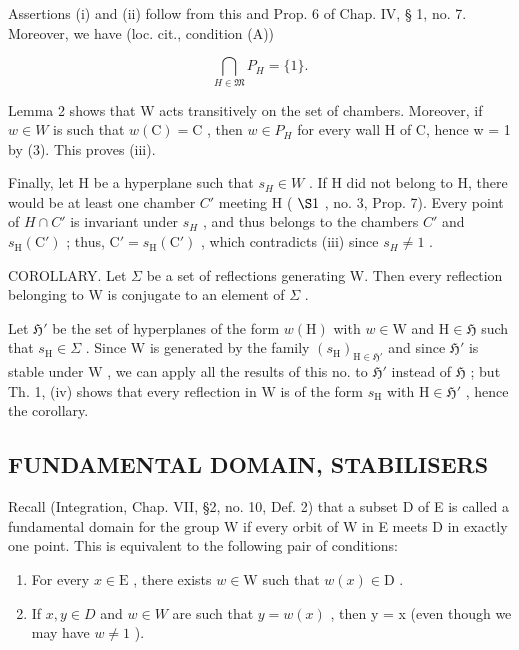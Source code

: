 Assertions (i) and (ii) follow from this and Prop. 6 of Chap. IV, § 1, no. 7. Moreover, we have (loc. cit., condition (A))

\[
\bigcap_ {H \in \mathfrak {M}} P _ {H} = \{1 \}.\tag{3}
\]

Lemma 2 shows that W acts transitively on the set of chambers. Moreover, if \(w \in W\) is such that \(w(\mathrm{C}) = \mathrm{C}\) , then \(w \in P_{H}\) for every wall H of C, hence w = 1 by (3). This proves (iii).

Finally, let H be a hyperplane such that \(s_{H} \in W\) . If H did not belong to H, there would be at least one chamber \(C'\) meeting H ( \(\S1\) , no. 3, Prop. 7). Every point of \(H \cap C'\) is invariant under \(s_{H}\) , and thus belongs to the chambers \(C'\) and \(s_{\mathrm{H}}(\mathrm{C}')\) ; thus, \(\mathrm{C}' = s_{\mathrm{H}}(\mathrm{C}')\) , which contradicts (iii) since \(s_{H} \neq 1\) .

COROLLARY. Let \(\Sigma\) be a set of reflections generating W. Then every reflection belonging to W is conjugate to an element of \(\Sigma\) .

Let \(\mathfrak{H}'\) be the set of hyperplanes of the form \(w(\mathrm{H})\) with \(w \in \mathrm{W}\) and \(\mathrm{H} \in \mathfrak{H}\) such that \(s_{\mathrm{H}} \in \Sigma\) . Since \(\mathrm{W}\) is generated by the family \((s_{\mathrm{H}})_{\mathrm{H} \in \mathfrak{H}'}\) and since \(\mathfrak{H}'\) is stable under \(\mathrm{W}\) , we can apply all the results of this no. to \(\mathfrak{H}'\) instead of \(\mathfrak{H}\) ; but Th. 1, (iv) shows that every reflection in \(\mathrm{W}\) is of the form \(s_{\mathrm{H}}\) with \(\mathrm{H} \in \mathfrak{H}'\) , hence the corollary.

\subsection{FUNDAMENTAL DOMAIN, STABILISERS}

Recall (Integration, Chap. VII, §2, no. 10, Def. 2) that a subset D of E is called a fundamental domain for the group W if every orbit of W in E meets D in exactly one point. This is equivalent to the following pair of conditions:

\begin{enumerate}
\def\labelenumi{\alph{enumi})}
\item
  For every \(x \in \mathrm{E}\) , there exists \(w \in \mathrm{W}\) such that \(w(x) \in \mathrm{D}\) .
\item
  If \(x, y \in D\) and \(w \in W\) are such that \(y = w(x)\) , then y = x (even though we may have \(w \neq 1\) ).
\end{enumerate}

